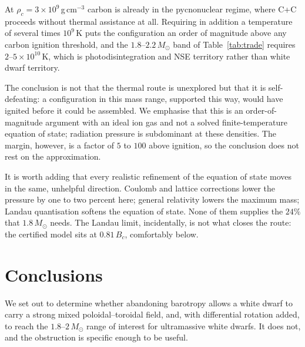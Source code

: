 \documentclass{aa}
\begin{document}
At $\rho_c = 3\times10^9$\,g\,cm$^{-3}$ carbon is already in the
pycnonuclear regime, where C+C proceeds without thermal assistance at
all. Requiring in addition a temperature of several times $10^9$\,K puts
the configuration an order of magnitude above any carbon ignition
threshold, and the $1.8$--$2.2\,M_\odot$ band of Table~\ref{tab:trade}
requires $2$--$5\times10^{10}$\,K, which is photodisintegration and NSE
territory rather than white dwarf territory.

The conclusion is not that the thermal route is unexplored but that it is
self-defeating: a configuration in this mass range, supported this way,
would have ignited before it could be assembled. We emphasise that this
is an order-of-magnitude argument with an ideal ion gas and not a solved
finite-temperature equation of state; radiation pressure is subdominant
at these densities. The margin, however, is a factor of $5$ to $100$
above ignition, so the conclusion does not rest on the approximation.

It is worth adding that every realistic refinement of the equation of
state moves in the same, unhelpful direction. Coulomb and lattice
corrections lower the pressure by one to two percent here; general
relativity lowers the maximum mass; Landau quantisation softens the
equation of state. None of them supplies the $24\%$ that
$1.8\,M_\odot$ needs. The Landau limit, incidentally, is not what
closes the route: the certified model sits at $0.81\,B_c$, comfortably
below.


\section{Conclusions}
\label{sec:conclusions}

We set out to determine whether abandoning barotropy allows a white dwarf
to carry a strong mixed poloidal--toroidal field, and, with differential
rotation added, to reach the $1.8$--$2\,M_\odot$ range of interest for
ultramassive white dwarfs. It does not, and the obstruction is specific
enough to be useful.
\end{document}
